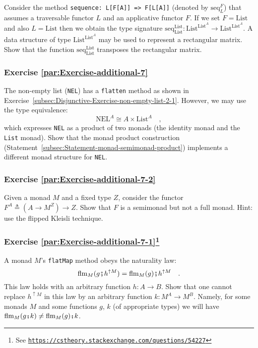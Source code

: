 Consider the method \lstinline!sequence: L[F[A]] => F[L[A]]! (denoted
by $\text{seq}_{L}^{F}$) that assumes a traversable functor $L$
and an applicative functor $F$. If we set $F=\text{List}$ and also
$L=\text{List}$ then we obtain the type signature $\text{seq}_{\text{List}}^{\text{List}}:\text{List}^{\text{List}^{A}}\rightarrow\text{List}^{\text{List}^{A}}$.
A data structure of type $\text{List}^{\text{List}^{A}}$ may be used
to represent a rectangular matrix. Show that the function $\text{seq}_{\text{List}}^{\text{List}}$
transposes the rectangular matrix.

\subsubsection{Exercise \label{par:Exercise-additional-7}\ref{par:Exercise-additional-7}}

The non-empty list (\lstinline!NEL!) has a \lstinline!flatten! method
as shown in Exercise~\ref{subsec:Disjunctive-Exercise-non-empty-list-2-1}.
However, we may use the type equivalence:
\[
\text{NEL}^{A}\cong A\times\text{List}^{A}\quad,
\]
which expresses \lstinline!NEL! as a product of two monads (the identity
monad and the \lstinline!List! monad). Show that the monad product
construction (Statement~\ref{subsec:Statement-monad-semimonad-product})
implements a different monad structure for \lstinline!NEL!.

\subsubsection{Exercise \label{par:Exercise-additional-7-2}\ref{par:Exercise-additional-7-2}}

Given a monad $M$ and a fixed type $Z$, consider the functor $F^{A}\triangleq(A\rightarrow M^{Z})\rightarrow Z$.
Show that $F$ is a semimonad but not a full monad. Hint: use the
flipped Kleisli technique.

\subsubsection{Exercise \label{par:Exercise-additional-7-1}\ref{par:Exercise-additional-7-1}\protect\footnote{See \texttt{\protect\href{https://cstheory.stackexchange.com/questions/54227}{https://cstheory.stackexchange.com/questions/54227}}}}

A monad $M$\textsf{'}s \lstinline!flatMap! method obeys the naturality law:
\[
\text{flm}_{M}(g\bef h^{\uparrow M})=\text{flm}_{M}(g)\bef h^{\uparrow M}\quad.
\]
This law holds with an arbitrary function $h:A\rightarrow B$. Show
that one cannot replace $h^{\uparrow M}$ in this law by an arbitrary
function $k:M^{A}\rightarrow M^{B}$. Namely, for some monads $M$
and some functions $g$, $k$ (of appropriate types) we will have
$\text{flm}_{M}(g\bef k)\neq\text{flm}_{M}(g)\bef k$.

